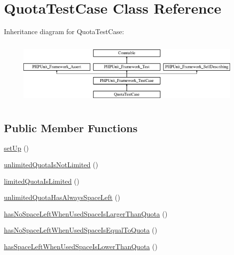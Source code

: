 \hypertarget{classorg_1_1bovigo_1_1vfs_1_1_quota_test_case}{}\section{Quota\+Test\+Case Class Reference}
\label{classorg_1_1bovigo_1_1vfs_1_1_quota_test_case}
Inheritance diagram for Quota\+Test\+Case\+:\begin{figure}[H]
\begin{center}
\leavevmode
\includegraphics[height=3.303835cm]{classorg_1_1bovigo_1_1vfs_1_1_quota_test_case}
\end{center}
\end{figure}
\subsection*{Public Member Functions}
\begin{DoxyCompactItemize}
\item 
\mbox{\hyperlink{classorg_1_1bovigo_1_1vfs_1_1_quota_test_case_a0bc688732d2b3b162ffebaf7812e78da}{set\+Up}} ()
\item 
\mbox{\hyperlink{classorg_1_1bovigo_1_1vfs_1_1_quota_test_case_a34ab6d3ce9666a582297524b9a5062bb}{unlimited\+Quota\+Is\+Not\+Limited}} ()
\item 
\mbox{\hyperlink{classorg_1_1bovigo_1_1vfs_1_1_quota_test_case_a9a2b92213621d95b408eb969360cb665}{limited\+Quota\+Is\+Limited}} ()
\item 
\mbox{\hyperlink{classorg_1_1bovigo_1_1vfs_1_1_quota_test_case_af8befe7a012a359d1b91f83bf7748e00}{unlimited\+Quota\+Has\+Always\+Space\+Left}} ()
\item 
\mbox{\hyperlink{classorg_1_1bovigo_1_1vfs_1_1_quota_test_case_ad1b974c1ea5eb0d0d129cff3f483549d}{has\+No\+Space\+Left\+When\+Used\+Space\+Is\+Larger\+Than\+Quota}} ()
\item 
\mbox{\hyperlink{classorg_1_1bovigo_1_1vfs_1_1_quota_test_case_a1b393ac0f881220ff990084072c28726}{has\+No\+Space\+Left\+When\+Used\+Space\+Is\+Equal\+To\+Quota}} ()
\item 
\mbox{\hyperlink{classorg_1_1bovigo_1_1vfs_1_1_quota_test_case_aeaaf935e7aad2e21e1da601d36bed191}{has\+Space\+Left\+When\+Used\+Space\+Is\+Lower\+Than\+Quota}} ()
\end{DoxyCompactItemize}
